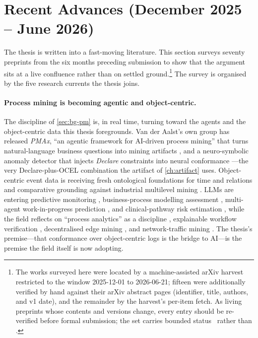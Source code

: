 \section{Recent Advances (December 2025 -- June 2026)}
\label{sec:recent}

The thesis is written into a fast-moving literature. This section surveys
seventy preprints from the six months preceding submission to show that the
argument sits at a live confluence rather than on settled ground.\footnote{The
works surveyed here were located by a machine-assisted arXiv harvest restricted to
the window 2025-12-01 to 2026-06-21; fifteen were additionally verified by hand
against their arXiv abstract pages (identifier, title, authors, and v1 date), and
the remainder by the harvest's per-item fetch. As living preprints whose contents
and versions change, every entry should be re-verified before formal submission;
the set carries bounded status \candidate\ rather than \admitted.} The survey is
organised by the five research currents the thesis joins.

\paragraph{Process mining is becoming agentic and object-centric.} The discipline
of \cref{sec:bg-pm} is, in real time, turning toward the agents and the
object-centric data this thesis foregrounds. Van der Aalst's own group has
released \emph{PMAx}, ``an agentic framework for AI-driven process mining'' that
turns natural-language business questions into mining artifacts
\citep{pmax26}, and a neuro-symbolic anomaly detector that injects \emph{Declare}
constraints into neural conformance \citep{gaikwad26}---the very Declare-plus-OCEL
combination the artifact of \cref{ch:artifact} uses. Object-centric event data is
receiving fresh ontological foundations for time and relations \citep{hooshyar25}
and comparative grounding against industrial multilevel mining \citep{ronzoni25}.
LLMs are entering predictive monitoring \citep{padella26}, business-process
modelling assessment \citep{lauer26}, multi-agent work-in-progress prediction
\citep{bibalan25}, and clinical-pathway risk estimation \citep{ardimento26}, while
the field reflects on ``process analytics'' as a discipline \citep{stierle25},
explainable workflow verification \citep{klimek25}, decentralised edge mining
\citep{reiter25}, and network-traffic mining \citep{vitale25}. The thesis's
premise---that conformance over object-centric logs is the bridge to AI---is the
premise the field itself is now adopting.

